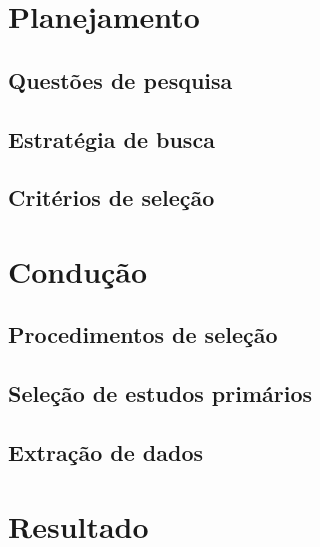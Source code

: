 \section{Planejamento}

\subsection{Questões de pesquisa}

\subsection{Estratégia de busca}

\subsection{Critérios de seleção}

\section{Condução}

\subsection{Procedimentos de seleção}

\subsection{Seleção de estudos primários}

\subsection{Extração de dados}

\section{Resultado}



 